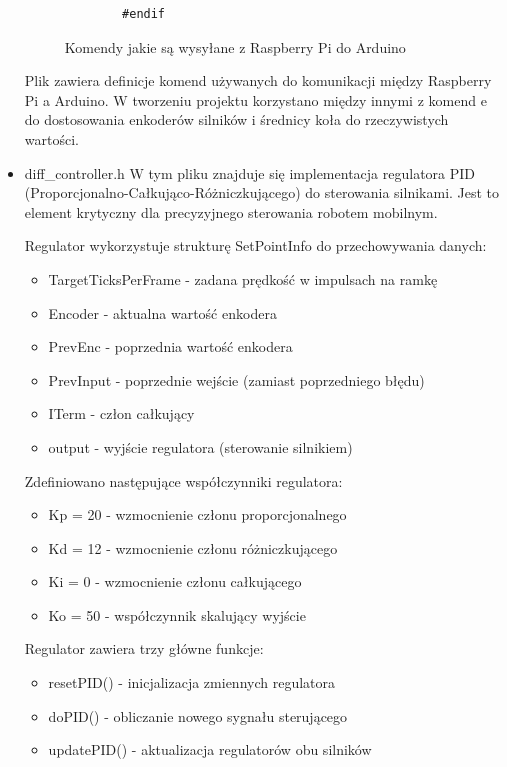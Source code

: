 \documentclass[a4paper,twoside,12pt]{book}
\begin{document}
\begin{itemize}
\begin{figure}[!hb]
\begin{lstlisting}
		#endif
	\end{lstlisting}
	\caption{Komendy jakie są wysyłane z Raspberry Pi do Arduino}
	\label{fig:Komendy jakie są wysyłane z Raspberry Pi do Arduino}
	\end{figure}

Plik zawiera definicje komend używanych do komunikacji między Raspberry Pi a Arduino. W tworzeniu projektu korzystano między innymi z komend e do dostosowania enkoderów silników i średnicy koła do rzeczywistych wartości.

\newpage
	\item diff\_controller.h
	W tym pliku znajduje się implementacja regulatora PID (Proporcjonalno-Całkująco-Różniczkującego) do sterowania silnikami. Jest to element krytyczny dla precyzyjnego sterowania robotem mobilnym.

	Regulator wykorzystuje strukturę SetPointInfo do przechowywania danych:
	\begin{itemize}
		\item TargetTicksPerFrame - zadana prędkość w impulsach na ramkę
		\item Encoder - aktualna wartość enkodera
		\item PrevEnc - poprzednia wartość enkodera
		\item PrevInput - poprzednie wejście (zamiast poprzedniego błędu)
		\item ITerm - człon całkujący
		\item output - wyjście regulatora (sterowanie silnikiem)
	\end{itemize}

	Zdefiniowano następujące współczynniki regulatora:
	\begin{itemize}
		\item Kp = 20 - wzmocnienie członu proporcjonalnego
		\item Kd = 12 - wzmocnienie członu różniczkującego
		\item Ki = 0 - wzmocnienie członu całkującego
		\item Ko = 50 - współczynnik skalujący wyjście
	\end{itemize}

	Regulator zawiera trzy główne funkcje:
	\begin{itemize}
		\item resetPID() - inicjalizacja zmiennych regulatora
		\item doPID() - obliczanie nowego sygnału sterującego
		\item updatePID() - aktualizacja regulatorów obu silników
	\end{itemize}


\end{itemize}
\end{document}
